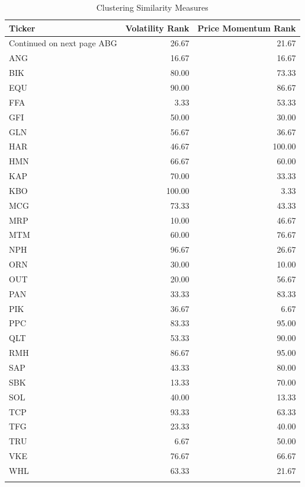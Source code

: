 \documentclass[11pt,preprint, authoryear]{elsarticle}
\numberwithin{equation}{section}
\numberwithin{figure}{section}
\numberwithin{table}{section}
\begin{document}
\begingroup\fontsize{12pt}{13pt}\selectfont
\begin{longtable}{lrr}
  \toprule
Ticker & Volatility  Rank & Price Momentum Rank \\ 
  \hline 
\endhead 
\hline 
{\footnotesize Continued on next page} 
\endfoot 
\endlastfoot 
 \midrule
ABG & 26.67 & 21.67 \\ 
  ANG & 16.67 & 16.67 \\ 
  BIK & 80.00 & 73.33 \\ 
  EQU & 90.00 & 86.67 \\ 
  FFA & 3.33 & 53.33 \\ 
  GFI & 50.00 & 30.00 \\ 
  GLN & 56.67 & 36.67 \\ 
  HAR & 46.67 & 100.00 \\ 
  HMN & 66.67 & 60.00 \\ 
  KAP & 70.00 & 33.33 \\ 
  KBO & 100.00 & 3.33 \\ 
  MCG & 73.33 & 43.33 \\ 
  MRP & 10.00 & 46.67 \\ 
  MTM & 60.00 & 76.67 \\ 
  NPH & 96.67 & 26.67 \\ 
  ORN & 30.00 & 10.00 \\ 
  OUT & 20.00 & 56.67 \\ 
  PAN & 33.33 & 83.33 \\ 
  PIK & 36.67 & 6.67 \\ 
  PPC & 83.33 & 95.00 \\ 
  QLT & 53.33 & 90.00 \\ 
  RMH & 86.67 & 95.00 \\ 
  SAP & 43.33 & 80.00 \\ 
  SBK & 13.33 & 70.00 \\ 
  SOL & 40.00 & 13.33 \\ 
  TCP & 93.33 & 63.33 \\ 
  TFG & 23.33 & 40.00 \\ 
  TRU & 6.67 & 50.00 \\ 
  VKE & 76.67 & 66.67 \\ 
  WHL & 63.33 & 21.67 \\ 
   \bottomrule
\caption{Clustering Similarity Measures\label{tab1}} 
\end{longtable}
\endgroup
\end{document}
